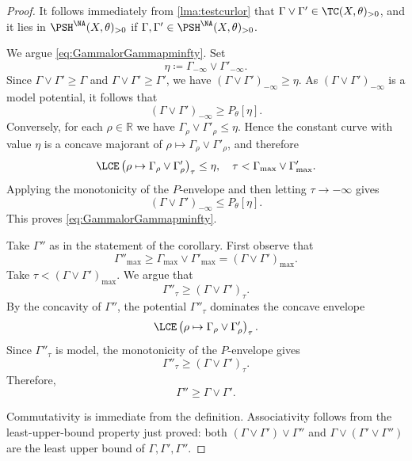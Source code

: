 \begin{proof}
    It follows immediately from \cref{lma:testcurlor} that $\Gamma\lor \Gamma'\in \TC(X,\theta)_{>0}$, and it lies in $\PSH^{\NA}(X,\theta)_{>0}$ if $\Gamma,\Gamma'\in \PSH^{\NA}(X,\theta)_{>0}$.

    We argue \eqref{eq:GammalorGammapminfty}. Set
    \[
        \eta\coloneqq \Gamma_{-\infty}\lor \Gamma'_{-\infty}.
    \]
    Since $\Gamma\lor\Gamma'\geq \Gamma$ and $\Gamma\lor\Gamma'\geq \Gamma'$, we have $(\Gamma\lor\Gamma')_{-\infty}\geq \eta$. As $(\Gamma\lor\Gamma')_{-\infty}$ is a model potential, it follows that
    \[
        (\Gamma\lor\Gamma')_{-\infty}\geq P_\theta[\eta].
    \]
    Conversely, for each $\rho\in \mathbb{R}$ we have $\Gamma_\rho\lor\Gamma'_\rho\leq \eta$. Hence the constant curve with value $\eta$ is a concave majorant of $\rho\mapsto \Gamma_\rho\lor\Gamma'_\rho$, and therefore
    \[
        \LCE\left(\rho\mapsto\Gamma_\rho\lor\Gamma'_\rho\right)_\tau\leq \eta,\quad \tau<\Gamma_{\max}\lor\Gamma'_{\max}.
    \]
    Applying the monotonicity of the $P$-envelope and then letting $\tau\to -\infty$ gives
    \[
        (\Gamma\lor\Gamma')_{-\infty}\leq P_\theta[\eta].
    \]
    This proves \eqref{eq:GammalorGammapminfty}.



    Take $\Gamma''$ as in the statement of the corollary.
    First observe that
    \[
        \Gamma''_{\max}\geq \Gamma_{\max} \lor \Gamma'_{\max}=(\Gamma\lor \Gamma')_{\max}.
    \]
    Take $\tau<(\Gamma\lor \Gamma')_{\max}$. We argue that
    \[
    \Gamma''_{\tau}\geq (\Gamma\lor \Gamma')_{\tau}.
    \]
    By the concavity of $\Gamma''$, the potential $\Gamma''_\tau$ dominates the concave envelope
    \[
    \LCE\left(\rho\mapsto \Gamma_{\rho}\lor \Gamma'_{\rho}\right)_\tau.
    \]
    Since $\Gamma''_\tau$ is model, the monotonicity of the $P$-envelope gives
    \[
    \Gamma''_{\tau}\geq (\Gamma\lor \Gamma')_{\tau}.
    \]
    Therefore,
    \[
    \Gamma''\geq \Gamma\lor \Gamma'.
    \]

    Commutativity is immediate from the definition. Associativity follows from the least-upper-bound property just proved: both $(\Gamma\lor\Gamma')\lor\Gamma''$ and $\Gamma\lor(\Gamma'\lor\Gamma'')$ are the least upper bound of $\Gamma,\Gamma',\Gamma''$.
\end{proof}

